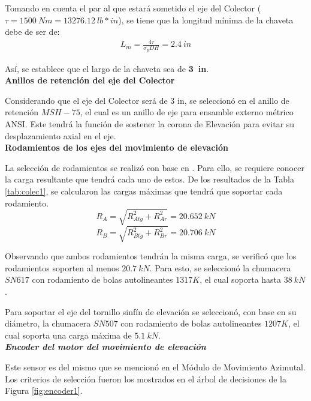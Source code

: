 Tomando en cuenta el par al que estará sometido el eje del Colector ($ \tau =1500\ Nm= 13276.12\ lb*in$), se tiene que la longitud mínima de la chaveta debe de ser de:
\begin{eqnarray}
L_m=\frac{4\tau}{\sigma_{p}DH}=2.4\ in
\end{eqnarray}

Así, se establece que el largo de la chaveta sea de \textbf{3\ in}.\\

\textbf{Anillos de retención del eje del Colector}

Considerando que el eje del Colector será de 3 in, se seleccionó en \cite{DDA4} el anillo de retención $ MSH-75 $, el cual es un anillo de eje para ensamble externo métrico ANSI. Este tendrá la función de sostener la corona de Elevación para evitar su desplazamiento axial en el eje.\\

\textbf{Rodamientos de los ejes del movimiento de elevación}

La selección de rodamientos se realizó con base en \cite{DDA5}. Para ello, se requiere conocer la carga resultante que tendrá cada uno de estos. De los resultados de la Tabla \ref{tab:colec1}, se calcularon las cargas máximas que tendrá que soportar cada rodamiento.
\begin{equation}
R_A=\sqrt{R_{Atg}^2+R_{Ar}^2}= 20.652\ kN
\end{equation}
\begin{equation}
R_B=\sqrt{R_{Btg}^2+R_{Br}^2}= 20.706\ kN
\end{equation}

Observando que ambos rodamientos tendrán la misma carga, se verificó que los rodamientos soporten al menos $ 20.7\ kN $. Para esto, se seleccionó la chumacera $ SN 617 $ con rodamiento de bolas autolineantes $ 1317 K $, el cual soporta hasta $ 38\ kN $.

Para soportar el eje del tornillo sinfín de elevación se seleccionó, con base en su diámetro, la chumacera $ SN 507 $ con rodamiento de bolas autolineantes $ 1207 K $, el cual soporta una carga máxima de $ 5.1\ kN $.\\

\textbf{\textit{Encoder del motor del movimiento de elevación}}

Este sensor es del mismo que se mencionó en el Módulo de Movimiento Azimutal. Los criterios de selección fueron los mostrados en el árbol de decisiones de la Figura \ref{fig:encoder1}.\\

